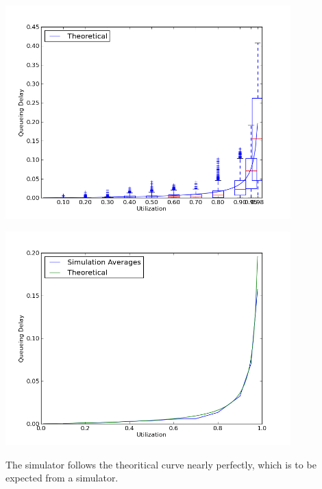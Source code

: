 \documentclass[11pt]{article}
\begin{document}
\begin{center}
\includegraphics[width=11cm]{../bar}
\end{center}
\begin{center}
\includegraphics[width=11cm]{../average}
\end{center}

The simulator follows the theoritical curve nearly perfectly, which is to be expected from a simulator.
\end{document}
